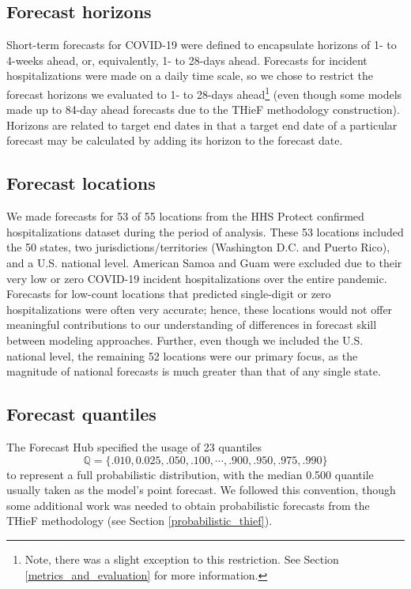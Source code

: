 \documentclass[thesis]{umassthesis}  %
\begin{document}
\subsection{Forecast horizons} \label{forecast_horizons}
Short-term forecasts for COVID-19 were defined to encapsulate horizons of 1- to 4-weeks ahead, or, equivalently, 1- to 28-days ahead\cite{cramer}. Forecasts for incident hospitalizations were made on a daily time scale, so we chose to restrict the forecast horizons we evaluated to 1- to 28-days ahead\footnote{Note, there was a slight exception to this restriction. See Section \ref{metrics_and_evaluation} for more information.} (even though some models made up to 84-day ahead forecasts due to the THieF methodology construction). Horizons are related to target end dates in that a target end date of a particular forecast may be calculated by adding its horizon to the forecast date.

\subsection{Forecast locations} \label{forecast_locations}
We made forecasts for 53 of 55 locations from the HHS Protect confirmed hospitalizations dataset during the period of analysis. These 53 locations included the 50 states, two jurisdictions/territories (Washington D.C. and Puerto Rico), and a U.S. national level. American Samoa and Guam were excluded due to their very low or zero COVID-19 incident hospitalizations over the entire pandemic. Forecasts for low-count locations that predicted single-digit or zero hospitalizations were often very accurate; hence, these locations would not offer meaningful contributions to our understanding of differences in forecast skill between modeling approaches\cite{cramer}. Further, even though we included the U.S. national level, the remaining 52 locations were our primary focus, as the magnitude of national forecasts is much greater than that of any single state.

\subsection{Forecast quantiles} \label{forecast_quantiles}
The Forecast Hub specified the usage of 23 quantiles \[\mathbb{Q} = \{.010, 0.025, .050, .100, \cdots, .900, .950, .975, .990\}\] to represent a full probabilistic distribution, with the median 0.500 quantile usually taken as the model's point forecast. We followed this convention, though some additional work was needed to obtain probabilistic forecasts from the THieF methodology (see Section \ref{probabilistic_thief}).
\end{document}
